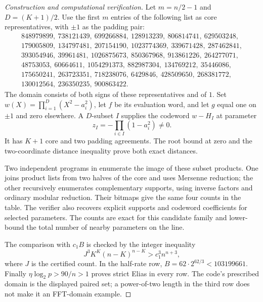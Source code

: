 \begin{proof}[Construction and computational verification]
Let $m=n/2-1$ and $D=(K+1)/2$. Use the first $m$ entries of the following
list as core representatives, with $\pm1$ as the padding pair:
\[
\begin{gathered}
848979899,\ 738121439,\ 699266884,\ 128913239,\ 806814741,\ 629503248,\\
179005809,\ 134797481,\ 207154190,\ 1023774369,\ 339671428,\ 287462841,\\
393054946,\ 39961481,\ 1026875673,\ 850367968,\ 913861226,\ 264277071,\\
48753053,\ 60664611,\ 1054291373,\ 882987304,\ 134769212,\ 35446086,\\
175650241,\ 263723351,\ 718238076,\ 6429846,\ 428509650,\ 268381772,\\
130012564,\ 236350235,\ 900863422.
\end{gathered}
\]
The domain consists of both signs of these representatives and of $1$.
Set $w(X)=\prod_{i=1}^D(X^2-a_i^2)$, let $f$ be its evaluation word,
and let $g$ equal one on $\pm1$ and zero elsewhere. A $D$-subset $I$
supplies the codeword $w-H_I$ at parameter
\[
 z_I=-\prod_{i\in I}(1-a_i^2)\ne0.
\]
It has $K+1$ core and two padding agreements. The root bound at zero
and the two-coordinate distance inequality prove both exact distances.

Two independent programs in 
enumerate the image of these subset products. One joins product lists
from two halves of the core and uses Mersenne reduction; the other
recursively enumerates complementary supports, using inverse factors
and ordinary modular reduction. Their bitmaps give the same four
counts in the table. The verifier also recovers explicit supports and
codeword coefficients for selected parameters. The counts are exact
for this candidate family and lower-bound the total number of nearby
parameters on the line.

The comparison with $c_1B$ is checked by the integer inequality
\[
 J^3K^K(n-K)^{n-K}>c_1^3n^{n+3},
\]
where $J$ is the certified count. In the half-rate row,
$B=62\cdot2^{62/3}<103199661$. Finally
$\eta\log_2p>90/n>1$ proves strict Elias in every row.
The code's prescribed domain is the displayed paired set; a power-of-two
length in the third row does not make it an FFT-domain example.
\end{proof}


